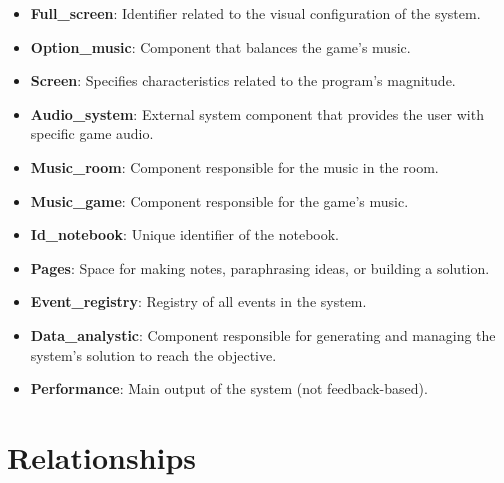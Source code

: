 \documentclass{article}
\begin{document}
\begin{itemize}[leftmargin=*]
    \item \textbf{\textbf{Full\_screen}}: Identifier related to the visual configuration of the system.
    \item \textbf{\textbf{Option\_music}}: Component that balances the game’s music.
    \item \textbf{\textbf{Screen}}: Specifies characteristics related to the program’s magnitude.
    \item \textbf{\textbf{Audio\_system}}: External system component that provides the user with specific game audio.
    \item \textbf{\textbf{Music\_room}}: Component responsible for the music in the room.
    \item \textbf{\textbf{Music\_game}}: Component responsible for the game’s music.
    \item \textbf{\textbf{Id\_notebook}}: Unique identifier of the notebook.
    \item \textbf{\textbf{Pages}}: Space for making notes, paraphrasing ideas, or building a solution.
    \item \textbf{\textbf{Event\_registry}}: Registry of all events in the system.
    \item \textbf{\textbf{Data\_analystic}}: Component responsible for generating and managing the system’s solution to reach the objective.
    \item \textbf{\textbf{Performance}}: Main output of the system (not feedback-based).
\end{itemize}

\section*{Relationships}
\end{document}
